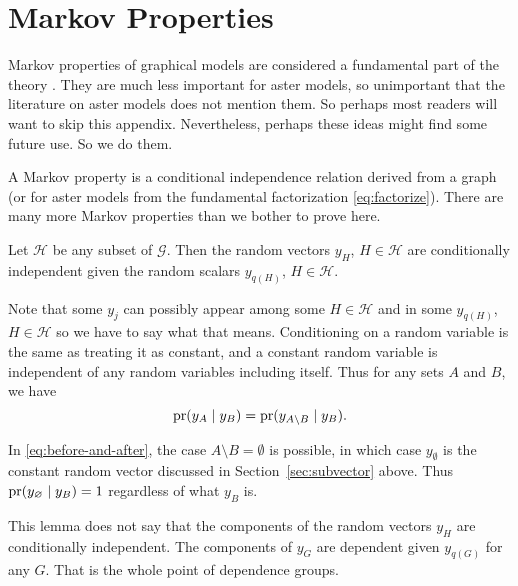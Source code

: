 
\chapter{Markov Properties}
\label{app:markov}

Markov properties of graphical models are considered a fundamental part
of the theory \citep[Chapter~3]{lauritzen}.  They are much less important
for aster models, so unimportant that the literature on aster models
does not mention them.
So perhaps most readers will want to skip this appendix.  Nevertheless,
perhaps these ideas might find some future use.  So we do them.

A Markov property is a conditional independence relation derived from a
graph (or for aster models from the fundamental factorization
\eqref{eq:factorize}).
There are many more Markov properties than we bother to prove here.

\begin{lemma} \label{lem:markov}
Let $\mathcal{H}$ be any subset of $\mathcal{G}$.  Then the random vectors
$y_H$, $H \in \mathcal{H}$ are conditionally independent given
the random scalars $y_{q(H)}$, $H \in \mathcal{H}$.
\end{lemma}

Note that some $y_j$ can possibly appear among some $H \in \mathcal{H}$
and in some $y_{q(H)}$, $H \in \mathcal{H}$ so we have to say what that means.
Conditioning on a random variable is the same as treating it as constant,
and a constant random variable is independent of any random variables
including itself.  Thus for any sets $A$ and $B$, we have
\begin{equation} \label{eq:before-and-after}
   \operatorname{pr}(y_A \mid y_B)
   =
   \operatorname{pr}(y_{A \setminus B} \mid y_B).
\end{equation}

In \eqref{eq:before-and-after}, the case $A \setminus B = \emptyset$
is possible, in which case $y_\emptyset$ is the constant random vector
discussed in Section~\ref{sec:subvector} above.
Thus $\operatorname{pr}(y_\varnothing \mid y_B) = 1$ regardless of what $y_B$ is.

This lemma does not say that the components of the random vectors $y_H$ are
conditionally independent.  The components of $y_G$ are dependent given
$y_{q(G)}$ for any $G$.  That is the whole point of dependence groups.

